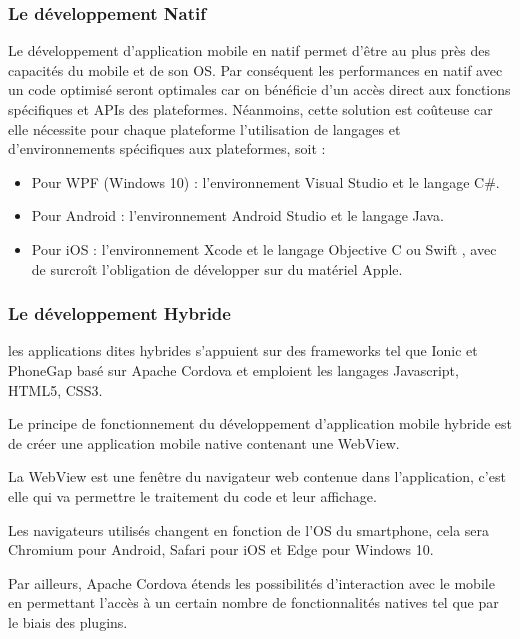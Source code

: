 \documentclass[11]{article}
\begin{document}
\subsubsection{Le développement Natif}
Le développement d’application mobile en natif permet d’être au plus près des capacités du mobile et de son OS. Par conséquent les performances en natif avec un code optimisé seront optimales car on bénéficie d’un accès direct aux fonctions spécifiques et APIs des plateformes.
Néanmoins, cette solution est coûteuse car elle nécessite pour chaque plateforme l’utilisation de langages et d’environnements spécifiques aux plateformes, soit :
\begin{itemize}
\item Pour WPF (Windows 10) : l’environnement Visual Studio et le langage C\#.
\item Pour Android : l’environnement Android Studio et le langage Java.
\item Pour iOS : l’environnement Xcode et le langage Objective C ou Swift , avec de surcroît l’obligation de développer sur du matériel Apple.
\end{itemize}

\subsubsection{Le développement Hybride}
les applications dites hybrides s’appuient sur des frameworks tel que Ionic et PhoneGap basé sur Apache Cordova et emploient les langages Javascript, HTML5, CSS3. 
     
 \vspace{0.5cm}
 
Le principe de fonctionnement du développement d'application mobile hybride est de créer une application mobile native contenant une WebView.
     
 \vspace{0.5cm}
 
La WebView est une fenêtre du navigateur web contenue dans l'application, c'est elle qui va permettre le traitement du code et leur affichage.
     
 \vspace{0.5cm}
 
Les navigateurs utilisés changent en fonction de l'OS du smartphone, cela sera Chromium pour Android, Safari pour iOS et Edge pour Windows 10.
     
 \vspace{0.5cm}
 
Par ailleurs, Apache Cordova étends les possibilités d'interaction avec le mobile en permettant l'accès à un certain nombre de fonctionnalités natives tel que par le biais des plugins.
     
\end{document}
